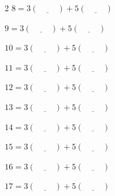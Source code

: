 \documentclass[fleqn]{article}
\theoremstyle{definition}
\begin{document}
\vspace{.25cm}
\begin{multicols}{2}
$8 = 3(\underline{\hspace{1cm}}) + 5(\underline{\hspace{1cm}})$

\vspace{.25cm}
$9 = 3(\underline{\hspace{1cm}}) + 5(\underline{\hspace{1cm}})$

\vspace{.25cm}
$10 = 3(\underline{\hspace{1cm}}) + 5(\underline{\hspace{1cm}})$

\vspace{.25cm}
$11 = 3(\underline{\hspace{1cm}}) + 5(\underline{\hspace{1cm}})$ 

\vspace{.25cm}
$12 = 3(\underline{\hspace{1cm}}) + 5(\underline{\hspace{1cm}})$ \columnbreak

\vspace{.25cm}
$13 = 3(\underline{\hspace{1cm}}) + 5(\underline{\hspace{1cm}})$

\vspace{.25cm}
$14 = 3(\underline{\hspace{1cm}}) + 5(\underline{\hspace{1cm}})$

\vspace{.25cm}
$15 = 3(\underline{\hspace{1cm}}) + 5(\underline{\hspace{1cm}})$

\vspace{.25cm}
$16 = 3(\underline{\hspace{1cm}}) + 5(\underline{\hspace{1cm}})$

\vspace{.25cm}
$17 = 3(\underline{\hspace{1cm}}) + 5(\underline{\hspace{1cm}})$
\end{multicols}
\end{document}
